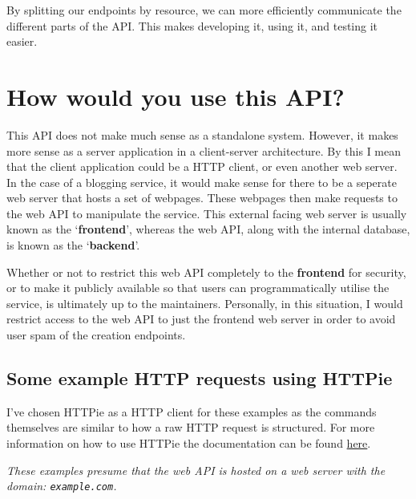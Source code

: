 \documentclass[]{full}
\theoremstyle{definition}
\begin{document}
By splitting our endpoints by resource, we can more efficiently communicate the different parts of the API. This makes developing it, using it, and testing it easier.

\section{How would you use this API?}

This API does not make much sense as a standalone system. However, it makes more sense as a server application in a client-server architecture. By this I mean that the client application could be a HTTP client, or even another web server. In the case of a blogging service, it would make sense for there to be a seperate web server that hosts a set of webpages. These webpages then make requests to the web API to manipulate the service. This external facing web server is usually known as the `\textbf{frontend}', whereas the web API, along with the internal database, is known as the `\textbf{backend}'.

Whether or not to restrict this web API completely to the \textbf{frontend} for security, or to make it publicly available so that users can programmatically utilise the service, is ultimately up to the maintainers. Personally, in this situation, I would restrict access to the web API to just the frontend web server in order to avoid user spam of the creation endpoints.

\subsection{Some example HTTP requests using HTTPie}

I've chosen HTTPie as a HTTP client for these examples as the commands themselves are similar to how a raw HTTP request is structured. For more information on how to use HTTPie the documentation can be found \href{https://httpie.io/docs/cli/examples}{here}.

\cprotect\textit{These examples presume that the web API is hosted on a web server with the domain: \verb|example.com|.}
\end{document}
